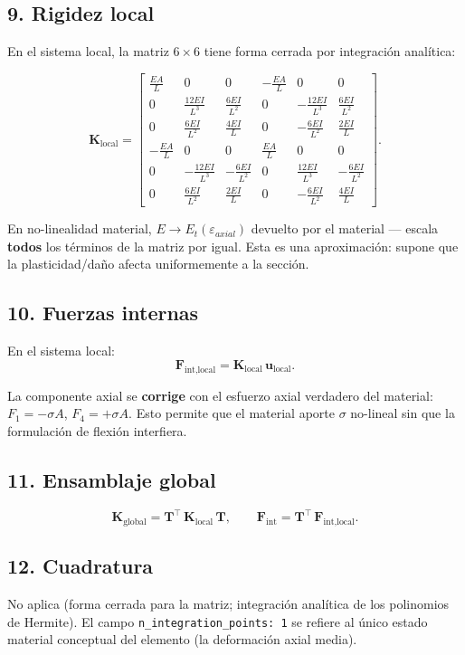 \documentclass[11pt,letterpaper,oneside]{report}
\begin{document}
\subsection{9. Rigidez local}
En el sistema local, la matriz $6\times 6$ tiene forma cerrada por integración analítica:

\[
\mathbf K_{\text{local}} = \begin{bmatrix}
 \tfrac{EA}{L} & 0 & 0 & -\tfrac{EA}{L} & 0 & 0 \\
 0 & \tfrac{12EI}{L^3} & \tfrac{6EI}{L^2} & 0 & -\tfrac{12EI}{L^3} & \tfrac{6EI}{L^2} \\
 0 & \tfrac{6EI}{L^2} & \tfrac{4EI}{L} & 0 & -\tfrac{6EI}{L^2} & \tfrac{2EI}{L} \\
-\tfrac{EA}{L} & 0 & 0 & \tfrac{EA}{L} & 0 & 0 \\
 0 & -\tfrac{12EI}{L^3} & -\tfrac{6EI}{L^2} & 0 & \tfrac{12EI}{L^3} & -\tfrac{6EI}{L^2} \\
 0 & \tfrac{6EI}{L^2} & \tfrac{2EI}{L} & 0 & -\tfrac{6EI}{L^2} & \tfrac{4EI}{L}
\end{bmatrix}.
\]

En no-linealidad material, $E \to E_t(\varepsilon_{axial})$ devuelto por el material --- escala \textbf{todos} los términos de la matriz por igual. Esta es una aproximación: supone que la plasticidad/daño afecta uniformemente a la sección.

\subsection{10. Fuerzas internas}
En el sistema local:
\[
\mathbf F_{\text{int,local}} = \mathbf K_{\text{local}}\,\mathbf u_{\text{local}}.
\]

La componente axial se \textbf{corrige} con el esfuerzo axial verdadero del material: $F_1 = -\sigma A$, $F_4 = +\sigma A$. Esto permite que el material aporte $\sigma$ no-lineal sin que la formulación de flexión interfiera.

\subsection{11. Ensamblaje global}
\[
\mathbf K_{\text{global}} = \mathbf T^\top\,\mathbf K_{\text{local}}\,\mathbf T, \qquad \mathbf F_{\text{int}} = \mathbf T^\top\,\mathbf F_{\text{int,local}}.
\]

\subsection{12. Cuadratura}
No aplica (forma cerrada para la matriz; integración analítica de los polinomios de Hermite). El campo \texttt{n\_integration\_points: 1} se refiere al único estado material conceptual del elemento (la deformación axial media).
\end{document}
